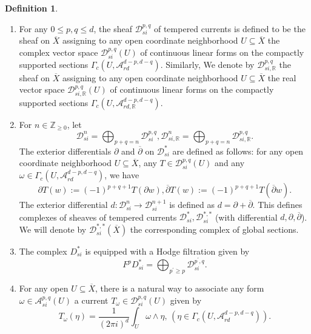 \documentclass[11pt, a4paper]{amsart}
\theoremstyle{plain}
\theoremstyle{definition}
\newtheorem{definition}[theorem]{Definition}
\numberwithin{equation}{section}
\def\RR{\mathbb{R}}
\def\ZZ{\mathbb{Z}}
\begin{document}
\begin{definition}
        \begin{enumerate}
            \item For any $0 \le p,q \le d$, the sheaf $\mathcal{D}_{si}^{p,q}$ of tempered currents is defined to be the sheaf on $\overline{X}$ assigning to any open coordinate neighborhood $U \subseteq \overline{X}$ the complex vector space $\mathcal{D}^{p,q}_{si}(U)$ of continuous linear forms on the compactly supported sections $\Gamma_{c}(U, \mathcal{A}_{rd}^{d - p, d - q})$. Similarly,  We denote by $\mathcal{D}_{si, \RR}^{p,q}$ the sheaf on $\overline{X}$ assigning to any open coordinate neighborhood $U \subseteq \overline{X}$ the real vector space $\mathcal{D}_{si, \RR}^{p,q}(U)$ of continuous linear forms on the compactly supported sections $\Gamma_{c}(U, \mathcal{A}_{rd, \RR}^{d - p, d -q})$. 
            \item For $n \in \ZZ_{\ge 0}$, let 
            \begin{equation*}
                \mathcal{D}_{si}^{n} = \bigoplus_{p + q = n} \mathcal{D}_{si}^{p, q},  \mathcal{D}_{si, \RR}^{n} = \bigoplus_{p + q = n} \mathcal{D}_{si, \RR}^{p, q}. 
            \end{equation*}
            The exterior differentials $\partial$ and $\overline{\partial}$ on $\mathcal{D}_{si}^{*}$ are defined as follows: for any open coordinate neighborhood $U \subseteq \overline{X}$, any $T \in \mathcal{D}^{p, q}_{si}(U)$ and any $\omega \in \Gamma_{c}(U, \mathcal{A}_{rd}^{d - p, d - q})$, we have 
            \begin{equation*}
                \partial T(w) := (-1)^{p + q + 1} T(\partial w),  \overline{\partial} T(w) := (-1)^{p + q + 1} T(\overline{\partial} w). 
            \end{equation*}
            The exterior differential $d \colon \mathcal{D}_{si}^{n} \rightarrow \mathcal{D}_{si}^{n + 1}$ is defined as $d = \partial + \overline{\partial}$. This defines complexes of sheaves of tempered currents $\mathcal{D}^{*}_{si}, \mathcal{D}_{si}^{*, *}$ (with differential $d, \partial, \overline{\partial}$). We will denote by $\mathcal{D}_{si}^{*, *}(\overline{X})$ the corresponding complex of global sections. 
            \item The complex $D^{*}_{si}$ is equipped with a Hodge filtration given by 
            \begin{equation*}
                F^{p}D^{*}_{si} = \bigoplus_{p^{\prime} \ge p} \mathcal{D}_{si}^{p^{\prime}, q}. 
            \end{equation*}
            \item For any open $U \subseteq \overline{X}$, there is a natural way to associate any form $\omega \in \mathcal{A}_{si}^{p, q}(U)$ a current $T_{\omega} \in \mathcal{D}_{si}^{p, q}(U)$ given by 
            \begin{equation*}
                T_{\omega}(\eta) = \frac{1}{(2\pi i)^{d}} \int_{U} \omega \wedge \eta , \, (\eta \in \Gamma_{c}(U, \mathcal{A}_{rd}^{d - p, d - q})). 
            \end{equation*}
        \end{enumerate}
\end{definition}
\end{document}
